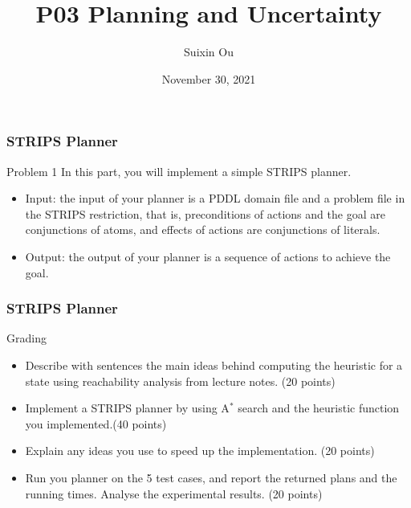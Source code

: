 \documentclass{beamer}
\title{P03 Planning and Uncertainty}
\author{Suixin Ou} %
\institute[SYSU] %
{
  School of Computer Science\\
  Sun Yat-sen University \\ %
  \medskip
}
\date{November 30, 2021} %
\begin{document}
\begin{frame}
  \titlepage
\end{frame}

\begin{frame}
  \frametitle{STRIPS Planner}
  \begin{block}{Problem 1}
In this part, you will implement a simple STRIPS planner.
\begin{itemize}
    \item  Input: the input of your planner is a PDDL domain file and a problem file in the STRIPS restriction, that is, preconditions of actions and the goal are conjunctions of atoms, and effects of actions are conjunctions of literals. 

    \item Output: the output of your planner is a sequence of actions to achieve the goal.
    \end{itemize}
  \end{block}
\end{frame}


\begin{frame}
  \frametitle{STRIPS Planner}

  \begin{block}{Grading}
    \begin{itemize}

\item Describe with sentences the main ideas behind computing the heuristic for a state using reachability analysis from lecture notes. (20 points)
    

\item Implement a STRIPS planner by using A$^*$ search and the heuristic function you implemented.(40 points)

\item Explain any ideas you use to speed up the implementation. (20 points)

\item Run you planner on the 5 test cases, and report the returned plans and the running times. Analyse the experimental results. (20 points)
    \end{itemize}
  \end{block}
\end{frame}
\end{document}
